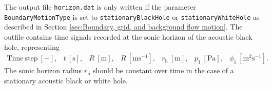 The output file {\tt horizon.dat} is only written if the parameter {\tt BoundaryMotionType} is set to {\tt stationaryBlackHole} or {\tt stationaryWhiteHole} as described in Section \ref{sec:Boundary, grid, and background flow motion}. The outfile contains time signals recorded at the sonic horizon of the acoustic black hole, representing
\begin{equation}
\begin{array}{lllllll}
  \mathrm{Time\:step\:\left[-\right]},
& t\:\mathrm{\left[s\right]},
& R\:\mathrm{\left[m\right]},
& \dot R\:\mathrm{\left[ms^{-1}\right]},
& r_{\mathrm{h}}\:\mathrm{\left[m\right]},
& p_1\:\mathrm{\left[Pa\right]},
& \phi_1\:\mathrm{\left[m^2s^{-1}\right]}.
\end{array}
\nonumber
\end{equation}
The sonic horizon radius $r_{\mathrm{h}}$ should be constant over time in the case of a stationary acoustic black or white hole.
